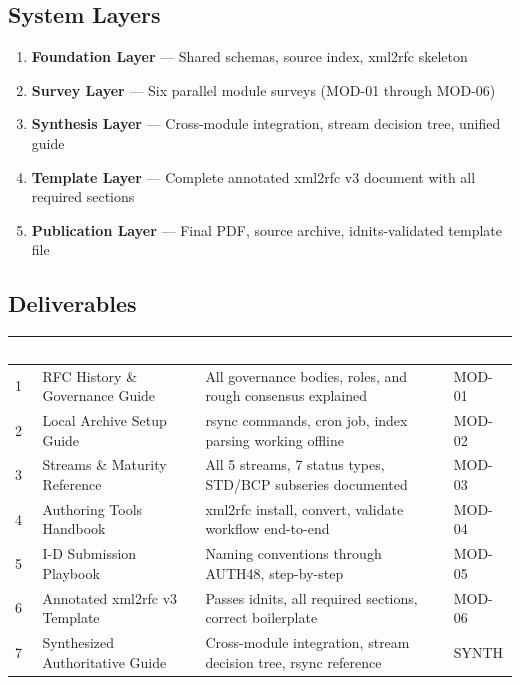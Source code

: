 \documentclass[11pt,letterpaper]{article}
\newcommand{\tableheader}[1]{\textbf{\sffamily\textcolor{white}{#1}}}
\begin{document}
\subsection{System Layers}

\begin{enumerate}
  \item \textbf{Foundation Layer} --- Shared schemas, source index, xml2rfc skeleton
  \item \textbf{Survey Layer} --- Six parallel module surveys (MOD-01 through MOD-06)
  \item \textbf{Synthesis Layer} --- Cross-module integration, stream decision tree, unified guide
  \item \textbf{Template Layer} --- Complete annotated xml2rfc v3 document with all required sections
  \item \textbf{Publication Layer} --- Final PDF, source archive, idnits-validated template file
\end{enumerate}

\subsection{Deliverables}

\begin{center}
\begin{tabularx}{\textwidth}{C{0.5cm}L{4cm}L{4cm}L{3cm}}
\toprule
{}
\tableheader{\#} & \tableheader{Deliverable} & \tableheader{Success Criteria} & \tableheader{Spec} \\
 & RFC History \& Governance Guide & All governance bodies, roles, and rough consensus explained & MOD-01 \\
2 & Local Archive Setup Guide & rsync commands, cron job, index parsing working offline & MOD-02 \\
3 & Streams \& Maturity Reference & All 5 streams, 7 status types, STD/BCP subseries documented & MOD-03 \\
4 & Authoring Tools Handbook & xml2rfc install, convert, validate workflow end-to-end & MOD-04 \\
5 & I-D Submission Playbook & Naming conventions through AUTH48, step-by-step & MOD-05 \\
6 & Annotated xml2rfc v3 Template & Passes idnits, all required sections, correct boilerplate & MOD-06 \\
7 & Synthesized Authoritative Guide & Cross-module integration, stream decision tree, rsync reference & SYNTH \\
\bottomrule
\end{tabularx}
\end{center}
\end{document}

